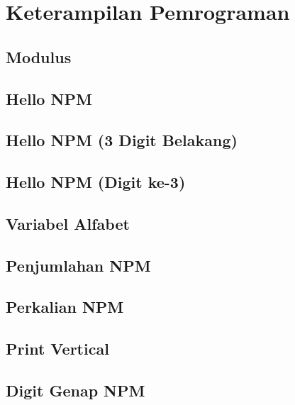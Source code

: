 \section{Keterampilan Pemrograman}
\subsection{Modulus}

\subsection{Hello NPM}

\subsection{Hello NPM (3 Digit Belakang)}

\subsection{Hello NPM (Digit ke-3)}

\subsection{Variabel Alfabet}

\subsection{Penjumlahan NPM}

\subsection{Perkalian NPM}

\subsection{Print Vertical}

\subsection{Digit Genap NPM}

